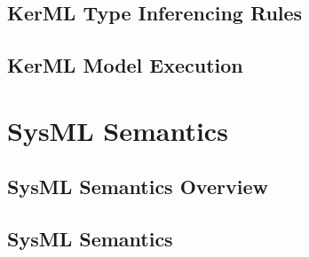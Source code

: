 \documentclass[fleqn,openany]{book}
\begin{document}


%




























\chapter{KerML Type Inferencing Rules}\label{chapter:kermltype}



\chapter{KerML Model Execution}\label{chapter:execution}



\part{SysML Semantics}\label{part:sysml}

\chapter{SysML Semantics Overview}\label{chapter:sysmloverview}


\chapter{SysML Semantics}\label{chapter:sysmlsemantics}
\end{document}
